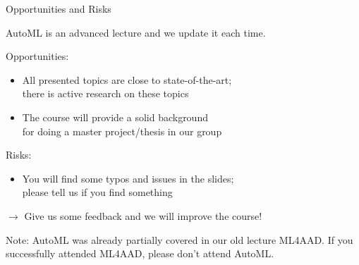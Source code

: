 \begin{frame}[c]{Opportunities and Risks}

AutoML is an advanced lecture and we update it each time.

\bigskip
\pause

Opportunities:
\begin{itemize}
  \item All presented topics are close to state-of-the-art;\\there is active research on these topics  
  \item The course will provide a solid background\\ for doing a master project/thesis in our group 
\end{itemize}

\medskip

Risks:
\begin{itemize}
  \item You will find some typos and issues in the slides;\\ please tell us if you find something
\end{itemize}

\medskip
\pause
$\to$ Give us some feedback and we will improve the course!

\medskip
\pause
Note: AutoML was already partially covered in our old lecture ML4AAD. 
If you successfully attended ML4AAD, please don't attend AutoML.

\end{frame}
	

